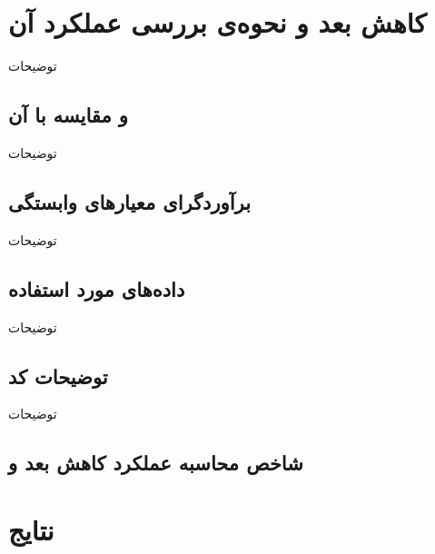 \chapter{
کاهش بعد و نحوه‌ی بررسی عملکرد آن
}
توضیحات

\section{
و مقایسه با آن
}
توضیحات
\section{
برآوردگر‌ای معیارهای وابستگی
}
توضیحات
\section{
داده‌های مورد استفاده
}
توضیحات
\section{
توضیحات کد
}
توضیحات
\section{
شاخص محاسبه عملکرد کاهش بعد و 
}


\chapter{
نتایج
}


